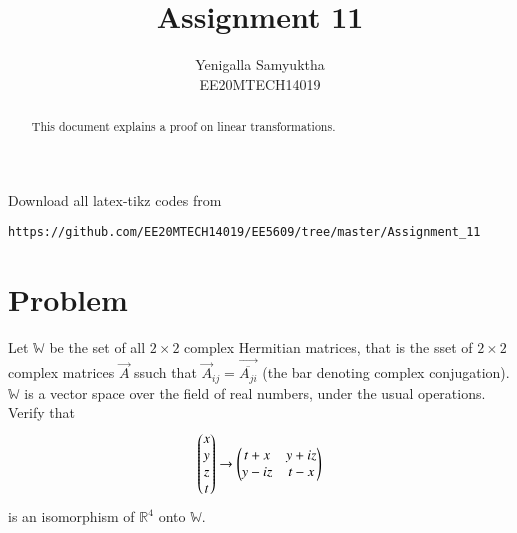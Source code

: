 \documentclass[journal,12pt,twocolumn]{IEEEtran}
\numberwithin{table}{section}
\begin{document}
     \def\rightbox#1{\makebox[0in][r]{#1}}
     \def\centbox#1{\makebox[0in]{#1}}
     \def\topbox#1{\raisebox{-\baselineskip}[0in][0in]{#1}}
     \def\midbox#1{\raisebox{-0.5\baselineskip}[0in][0in]{#1}}
\vspace{3cm}
\title{Assignment 11}
\author{Yenigalla Samyuktha\\EE20MTECH14019}
\maketitle
\newpage
\bigskip
\renewcommand{\thefigure}{\theenumi}
\renewcommand{\thetable}{\theenumi}
\begin{abstract}
This document explains a proof on linear transformations.
\end{abstract}
Download all latex-tikz codes from 
%
\begin{lstlisting}
https://github.com/EE20MTECH14019/EE5609/tree/master/Assignment_11
\end{lstlisting}
%
\section{Problem}
Let $\mathbb{W}$ be the set of all $2\times2$ complex Hermitian matrices, that is the sset of $2\times2$ complex matrices $\vec{A}$ ssuch that $\vec{A}_{ij}=\vec{\overline{A_{ji}}}$ (the bar denoting complex conjugation). $\mathbb{W}$ is a vector space over the field of real numbers, under the usual operations. Verify that
\begin{align}\label{iso}
\begin{pmatrix}x\\y\\z\\t\end{pmatrix} \rightarrow \begin{pmatrix}t+x&y+iz\\y-iz&t-x\end{pmatrix}
\end{align}
is an isomorphism of $\mathbb{R}^4$ onto $\mathbb{W}$.
\end{document}
